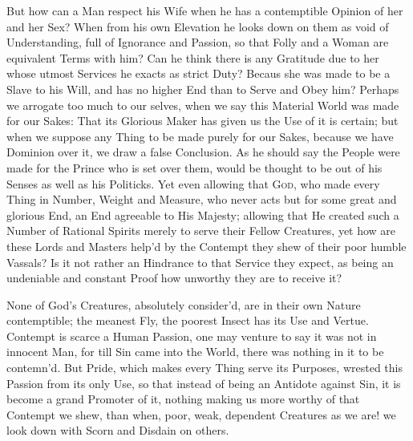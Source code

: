 But how can a Man respect his Wife when he has a contemptible Opinion
of her and her Sex? When from his own Elevation he looks down on them
as void of Understanding, full of Ignorance and Passion, so that Folly
and a Woman are equivalent Terms with him? Can he think there is any
Gratitude due to her whose utmost Services he exacts as strict Duty?
Becaus she was made to be a Slave to his Will, and has no higher End
than to Serve and Obey him? Perhaps we arrogate too much to our
selves, when we say this Material World was made for our Sakes: That
its Glorious Maker has given us the Use of it is certain; but when we
suppose any Thing to be made purely for our Sakes, because we have
Dominion over it, we draw a false Conclusion. As he should say the
People were made for the Prince who is set over them,  would
be thought to be out of his Senses as well as his Politicks. Yet even
allowing that \textsc{God}, who made every Thing in Number, Weight and
Measure, who never acts but for some great and glorious End, an End
agreeable to His Majesty; allowing that He created such a Number of
Rational Spirits merely to serve their Fellow Creatures, yet how are
these Lords and Masters help'd by the Contempt they shew of their poor
humble Vassals? Is it not rather an Hindrance to that Service they
expect, as being an undeniable and constant Proof how unworthy they
are to receive it?

None of God's Creatures, absolutely consider'd, are in their own
Nature contemptible; the meanest Fly, the poorest Insect has its Use
and Vertue. Contempt is scarce a Human Passion, one may venture to say
it was not in innocent Man, for till Sin came into the World, there
was nothing in it to be contemn'd. But Pride, which makes every Thing
serve its Purposes, wrested this Passion from  its only Use,
so that instead of being an Antidote against Sin, it is become a grand
Promoter of it, nothing making us more worthy of that Contempt we
shew, than when, poor, weak, dependent Creatures as we are! we look
down with Scorn and Disdain on others.

